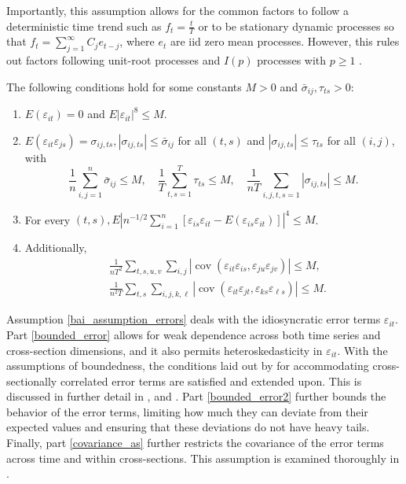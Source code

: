 Importantly, this assumption allows for the common factors to follow a deterministic time trend such as $f_t = \frac{t}{T}$ or to be stationary dynamic processes so that $f_t=\sum_{j=1}^{\infty} C_j e_{t-j}$, where  $e_t$  are \ac{iid} zero mean processes. However, this rules out factors following unit-root processes and $I(p)$ processes with $p \geq 1$ \citep{bai2009panel, bada2014parameter}.

\begin{assumption}\label{bai_assumption_errors}
    The following conditions hold for some constants \(M > 0\) and \(\bar{\sigma}_{i j}, \tau_{t s} > 0\):
    \begin{enumerate}[label = (\roman*)]
        \item \(E(\varepsilon_{i t})=0\) and \(E|\varepsilon_{i t}|^8 \leq M\).
        \item \(E(\varepsilon_{i t} \varepsilon_{j s})=\sigma_{i j, t s}, |\sigma_{i j, t s}| \leq \bar{\sigma}_{i j}\) for all \((t, s)\) and \(|\sigma_{i j, t s}| \leq \tau_{t s}\) for all \((i, j)\), with
        \[
        \frac{1}{n} \sum_{i, j=1}^n \bar{\sigma}_{i j} \leq M, \quad \frac{1}{T} \sum_{t, s=1}^T \tau_{t s} \leq M, \quad \frac{1}{n T} \sum_{i, j, t, s=1}|\sigma_{i j, t s}| \leq M.
        \]\label{bounded_error}
        \item For every \((t, s), E\left|n^{-1 / 2} \sum_{i=1}^n\left[\varepsilon_{i s} \varepsilon_{i t}-E(\varepsilon_{i s} \varepsilon_{i t})\right]\right|^4 \leq M\).\label{bounded_error2}
        \item Additionally,
        \[
       \begin{aligned}
        & \frac{1}{nT^2} \sum_{t, s, u, v} \sum_{i, j}\left|\operatorname{cov}\left(\varepsilon_{i t} \varepsilon_{i s}, \varepsilon_{j u} \varepsilon_{j v}\right)\right| \leq M, \\
        & \frac{1}{n^2T} \sum_{t, s} \sum_{i, j, k, \ell}\left|\operatorname{cov}\left(\varepsilon_{i t} \varepsilon_{j t}, \varepsilon_{k s} \varepsilon_{\ell s}\right)\right| \leq M .\label{covariance_as}
\end{aligned}
        \]
    \end{enumerate}
\end{assumption}

Assumption \ref{bai_assumption_errors} deals with the idiosyncratic error terms $\varepsilon_{it}$. Part \ref{bounded_error} allows for weak dependence across both time series and cross-section dimensions, and it also permits heteroskedasticity in \( \varepsilon_{it} \). With the assumptions of boundedness, the conditions laid out by \citet{chamberlain1982arbitrage} for accommodating cross-sectionally correlated error terms are satisfied and extended upon. This is discussed in further detail in \citet{bai2002determining}, \citet{bai2003inferential} and \citet{bai2008large}. Part \ref{bounded_error2} further bounds the behavior of the error terms, limiting how much they can deviate from their expected values and ensuring that these deviations do not have heavy tails. Finally, part \ref{covariance_as} further restricts the covariance of the error terms across time and within cross-sections. This assumption is examined thoroughly in \citet{bai2009panel}.
 
